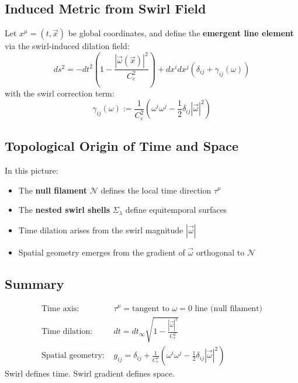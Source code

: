 \documentclass[12pt]{article}
\begin{document}
    \subsection{Induced Metric from Swirl Field}
    \label{subsec:induced_metric}

    Let \( x^\mu = (t, \vec{x}) \) be global coordinates, and define the \textbf{emergent line element} via the swirl-induced dilation field:
    \[
        ds^2 = -dt^2 \left( 1 - \frac{|\vec{\omega}(\vec{x})|^2}{C_e^2} \right) + dx^i dx^j \left( \delta_{ij} + \gamma_{ij}(\omega) \right)
    \]
    with the swirl correction term:
    \[
        \gamma_{ij}(\omega) := \frac{1}{C_e^2} \left( \omega^i \omega^j - \frac{1}{2} \delta_{ij} |\vec{\omega}|^2 \right)
    \]

    \subsection{Topological Origin of Time and Space}
    \label{subsec:topological_emergence}

    In this picture:
    \begin{itemize}[leftmargin=1.5em]
        \item The \textbf{null filament} \( \mathcal{N} \) defines the local time direction \( \tau^\mu \)
        \item The \textbf{nested swirl shells} \( \Sigma_\lambda \) define equitemporal surfaces
        \item Time dilation arises from the swirl magnitude \( |\vec{\omega}| \)
        \item Spatial geometry emerges from the gradient of \( \vec{\omega} \) orthogonal to \( \mathcal{N} \)
    \end{itemize}

    \subsection*{Summary}

    \begin{tcolorbox}[colback=purple!2, colframe=purple!60!black, title=Emergent Space-Time Structure]
        \begin{align*}
            \text{Time axis: } & \tau^\mu = \text{tangent to } \omega = 0 \text{ line (null filament)} \\
            \text{Time dilation: } & dt = dt_\infty \sqrt{1 - \frac{|\vec{\omega}|^2}{C_e^2}} \\
            \text{Spatial geometry: } & g_{ij} = \delta_{ij} + \frac{1}{C_e^2} \left( \omega^i \omega^j - \frac{1}{2} \delta_{ij} |\vec{\omega}|^2 \right)
        \end{align*}
        Swirl defines time. Swirl gradient defines space.
    \end{tcolorbox}
\end{document}
